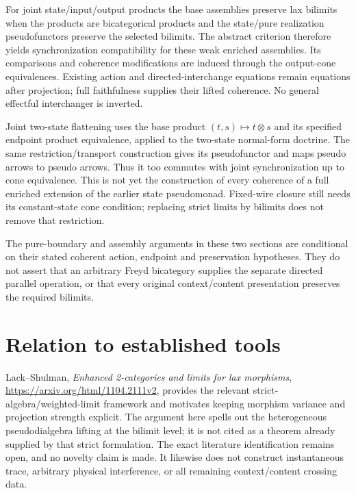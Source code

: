 \documentclass{article}
\begin{document}
For joint state/input/output products the base assemblies preserve lax bilimits when the products are bicategorical products and the state/pure realization pseudofunctors preserve the selected bilimits. The abstract criterion therefore yields synchronization compatibility for these weak enriched assemblies. Its comparisons and coherence modifications are induced through the output-cone equivalences. Existing action and directed-interchange equations remain equations after projection; full faithfulness supplies their lifted coherence. No general effectful interchanger is inverted.

Joint two-state flattening uses the base product $(t,s)\mapsto t\otimes s$ and its specified endpoint product equivalence, applied to the two-state normal-form doctrine. The same restriction/transport construction gives its pseudofunctor and maps pseudo arrows to pseudo arrows. Thus it too commutes with joint synchronization up to cone equivalence. This is not yet the construction of every coherence of a full enriched extension of the earlier state pseudomonad. Fixed-wire closure still needs its constant-state cone condition; replacing strict limits by bilimits does not remove that restriction.

The pure-boundary and assembly arguments in these two sections are conditional on their stated coherent action, endpoint and preservation hypotheses. They do not assert that an arbitrary Freyd bicategory supplies the separate directed parallel operation, or that every original context/content presentation preserves the required bilimits.

\section{Relation to established tools}
Lack--Shulman, \emph{Enhanced 2-categories and limits for lax morphisms}, \url{https://arxiv.org/html/1104.2111v2}, provides the relevant strict-algebra/weighted-limit framework and motivates keeping morphism variance and projection strength explicit. The argument here spells out the heterogeneous pseudodialgebra lifting at the bilimit level; it is not cited as a theorem already supplied by that strict formulation. The exact literature identification remains open, and no novelty claim is made. It likewise does not construct instantaneous trace, arbitrary physical interference, or all remaining context/content crossing data.
\end{document}
